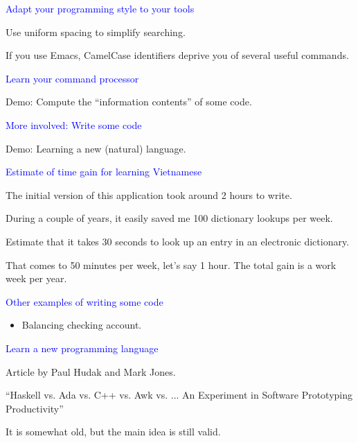 \documentclass{slides}
\newcommand{\ti}[1]{\begin{center}\Large{\textcolor{blue}{#1}}\end{center}}
\begin{document}
\begin{slide}\ti{Adapt your programming style to your tools}

Use uniform spacing to simplify searching.

If you use Emacs, CamelCase identifiers deprive you of several useful
commands.

\vfill\end{slide}
\begin{slide}\ti{Learn your command processor}

Demo: Compute the ``information contents'' of some code.

\vfill\end{slide}
\begin{slide}\ti{More involved: Write some code}

Demo: Learning a new (natural) language.

\vfill\end{slide}
\begin{slide}\ti{Estimate of time gain for learning Vietnamese}

The initial version of this application took around 2 hours to write.

During a couple of years, it easily saved me 100 dictionary lookups
per week.  

Estimate that it takes 30 seconds to look up an entry in an electronic
dictionary.

That comes to 50 minutes per week, let's say 1 hour.  The total gain
is a work week per year.

\vfill\end{slide}
\begin{slide}\ti{Other examples of writing some code}

  \begin{itemize}
  \item Balancing checking account.
  \end{itemize}

\vfill\end{slide}
\begin{slide}\ti{Learn a new programming language}

Article by Paul Hudak and Mark Jones.

``Haskell vs. Ada vs. C++ vs. Awk vs. ... An Experiment in Software
Prototyping Productivity''

It is somewhat old, but the main idea is still valid.

\vfill\end{slide}
\end{document}
